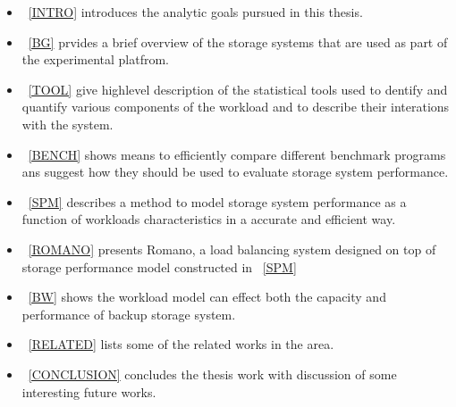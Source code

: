 \begin{itemize}

\item \CHP~\ref{INTRO} introduces the analytic goals pursued in this thesis.

\item \CHP~\ref{BG} prvides a brief overview of the storage systems that are used as part of the experimental platfrom.

\item \CHP~\ref{TOOL} give highlevel description of the statistical tools used to dentify and quantify various components of the workload and to describe their interations with the system. 

\item \CHP~\ref{BENCH} shows means to efficiently compare different benchmark programs ans suggest how they should be used to evaluate storage system performance. 

\item \CHP~\ref{SPM} describes a method to model storage system performance as a function of workloads characteristics in a accurate and efficient way.

\item \CHP~\ref{ROMANO} presents Romano, a load balancing system designed on top of storage performance model constructed in \CHP~\ref{SPM}

\item \CHP~\ref{BW} shows the workload model can effect both the capacity and performance of backup storage system. 

\item \CHP~\ref{RELATED} lists some of the related works in the area.

\item \CHP~\ref{CONCLUSION} concludes the thesis work with discussion of some interesting future works. 
 
\end{itemize}
